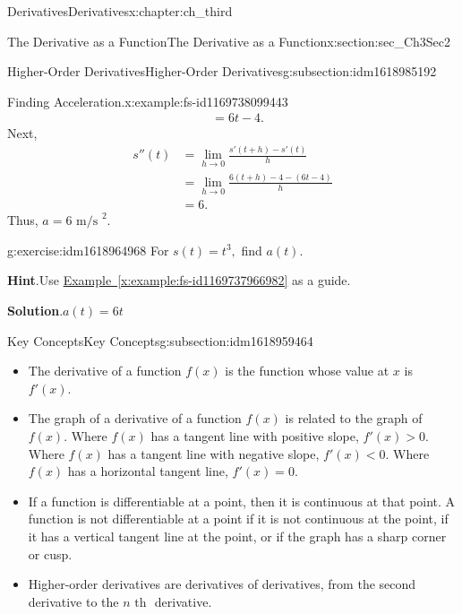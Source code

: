 \documentclass[oneside,10pt,]{book}
\newcommand{\blocktitlefont}{\relax}
\newcommand{\xreffont}{\relax}
\numberwithin{equation}{section}
\newcommand{\lt}{<}
\newcommand{\gt}{>}
\newcommand{\amp}{&}
\begin{document}
\begin{chapterptx}{Derivatives}{}{Derivatives}{}{}{x:chapter:ch_third}
\begin{sectionptx}{The Derivative as a Function}{}{The Derivative as a Function}{}{}{x:section:sec_Ch3Sec2}
\begin{subsectionptx}{Higher-Order Derivatives}{}{Higher-Order Derivatives}{}{}{g:subsection:idm1618985192}
\begin{example}{Finding Acceleration.}{x:example:fs-id1169738099443}
\begin{align*}
\amp=6t-4.
\end{align*}
Next,%
%
\begin{align*}
s''(t)\amp=\lim_{h\to 0}\frac{s'(t+h)-s'(t)}{h}\\
\amp=\lim_{h\to 0}\frac{6(t+h)-4-(6t-4)}{h}\\
\amp=6.
\end{align*}
Thus, \(a=6 \text{ m/s }^2.\)%
\end{example}
\begin{inlineexercise}{}{g:exercise:idm1618964968}%
For \(s(t)=t^3,\) find \(a(t).\)%
\par\smallskip%
\noindent\textbf{\blocktitlefont Hint}.\hypertarget{g:hint:idm1618961512}{}\quad{}Use \hyperref[x:example:fs-id1169737966982]{Example~{\xreffont\ref{x:example:fs-id1169737966982}}} as a guide.%
\par\smallskip%
\noindent\textbf{\blocktitlefont Solution}.\hypertarget{g:solution:idm1618962408}{}\quad{}\(a(t)=6t\)%
\end{inlineexercise}%
\end{subsectionptx}
%
%
\typeout{************************************************}
\typeout{************************************************}
%
\begin{subsectionptx}{Key Concepts}{}{Key Concepts}{}{}{g:subsection:idm1618959464}
%
\begin{itemize}[label=\textbullet]
\item{}The derivative of a function \(f(x)\) is the function whose value at \(x\) is \(f'(x).\)%
\item{}The graph of a derivative of a function \(f(x)\) is related to the graph of \(f(x).\) Where \(f(x)\) has a tangent line with positive slope, \(f'(x)\gt 0.\) Where \(f(x)\) has a tangent line with negative slope, \(f'(x)\lt 0.\) Where \(f(x)\) has a horizontal tangent line, \(f'(x)=0.\)%
\item{}If a function is differentiable at a point, then it is continuous at that point. A function is not differentiable at a point if it is not continuous at the point, if it has a vertical tangent line at the point, or if the graph has a sharp corner or cusp.%
\item{}Higher-order derivatives are derivatives of derivatives, from the second derivative to the \(n\text{ th }\) derivative.%
\end{itemize}
\end{subsectionptx}
%
%
\typeout{************************************************}

\end{sectionptx}
\end{chapterptx}
\end{document}
